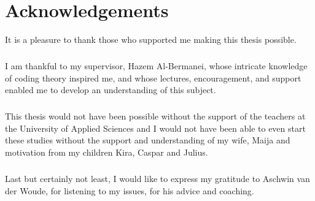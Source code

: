 \documentclass[../main.tex]{subfiles}
\begin{document}
    \chapter*{Acknowledgements}
    It is a pleasure to thank those who supported me making this thesis possible.

    \paragraph{}
    I am thankful to my supervisor, Hazem Al-Bermanei, whose intricate
    knowledge of coding theory inspired me, and whose lectures, encouragement,
    and support enabled me to develop an understanding of this subject.

    \paragraph{}
    This thesis would not have been possible without the support of the teachers
    at the University of Applied Sciences and I would not have been able to even
    start these studies without the support and understanding of my wife, Maija
    and motivation from my children Kira, Caspar and Julius.

    \paragraph{}
    Last but certainly not least, I would like to express my gratitude to Aschwin
    van der Woude, for listening to my issues, for his advice and coaching.
\end{document}
